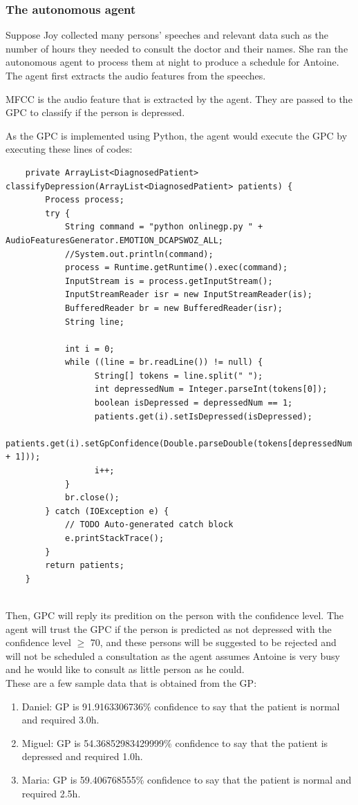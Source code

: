 \documentclass{article}
\begin{document}
	\subsubsection{The autonomous agent}
	Suppose Joy collected many persons' speeches and relevant data such as the number of hours they needed to consult the doctor and their names. 
	She ran the autonomous agent to process them at night to produce a schedule for Antoine.
	The agent first extracts the audio features from the speeches.


	MFCC is the audio feature that is extracted by the agent. They are passed to the GPC to classify if the person is depressed. 

	As the GPC is implemented using Python, the agent would execute the GPC by executing these lines of codes:

	\begin{lstlisting}
	private ArrayList<DiagnosedPatient> classifyDepression(ArrayList<DiagnosedPatient> patients) {
		Process process;
		try {
			String command = "python onlinegp.py " + AudioFeaturesGenerator.EMOTION_DCAPSWOZ_ALL;
			//System.out.println(command);
			process = Runtime.getRuntime().exec(command);
			InputStream is = process.getInputStream();
			InputStreamReader isr = new InputStreamReader(is);
			BufferedReader br = new BufferedReader(isr);
			String line;
			
			int i = 0;
			while ((line = br.readLine()) != null) {
				  String[] tokens = line.split(" ");
				  int depressedNum = Integer.parseInt(tokens[0]);
				  boolean isDepressed = depressedNum == 1;
				  patients.get(i).setIsDepressed(isDepressed);
				  patients.get(i).setGpConfidence(Double.parseDouble(tokens[depressedNum + 1])); 
				  i++;
			}
			br.close();
		} catch (IOException e) {
			// TODO Auto-generated catch block
			e.printStackTrace();
		}
		return patients;
	}
	
	\end{lstlisting}

	Then, GPC will reply its predition on the person with the confidence level.
	The agent will trust the GPC if the person is predicted as not depressed with the confidence level \(\geq\) 70,
	and these persons will be suggested to be rejected and will not be scheduled a consultation as the agent assumes Antoine is very busy and 
	he would like to consult as little person as he could.
	\\

	These are a few sample data that is obtained from the GP:
	\begin{enumerate}
     	\item Daniel: GP is 91.9163306736\% confidence to say that the patient is normal and required 3.0h.
		\item Miguel: GP is 54.36852983429999\% confidence to say that the patient is depressed and required 1.0h.
		\item Maria: GP is 59.406768555\% confidence to say that the patient is normal and required 2.5h.
     \end{enumerate}
\end{document}

